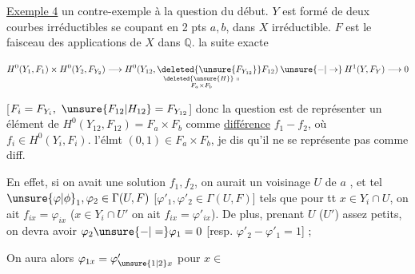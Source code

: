 
\uline{Exemple 4}  un contre-exemple à la question du début. $Y$ est formé de deux courbes irréductibles  se coupant en 2 pts $a,b$, dans $X$ irréductible. $F$ est le faisceau des applications de $X$ dans $\mathbb{Q}$.   la suite exacte


\[
H^0(Y_1,F_1)\times H^0(Y_2,F_{Y_2})\longrightarrow
\underset{\substack{\deleted{\unsure{H}}\ \shortparallel\\F_a\times F_b}}{H^0(Y_{12},\deleted{\unsure{F_{Y_{12}}}} F_{12})}
\mathbin{\unsure{-|\to}}H^1(Y,F_Y)\longrightarrow0
\]

[$F_i=F_{Y_i},\ \unsure{F_{12}|H_{12}}=F_{Y_{12}}$] donc la question est de représenter un élément de $H^0(Y_{12},F_{12})=F_a\times F_b$ comme \uline{différence} $f_1-f_2$, où $f_i\in H^0(Y_i,F_i)$.  l'élmt $(0,1)\in F_a\times F_b$, je dis qu'il ne se représente pas comme diff.

En effet, si on avait une solution $f_1,f_2$, on aurait un voisinage $U$  de $a$ , et  tel  $\unsure{\varphi|\phi}_1,\varphi_2\in\Gamma(U,F)$  [$\varphi'_1,\varphi'_2\in\Gamma(U,F)$]  tels que pour tt $x\in Y_i\cap U$, on ait $f_{ix}=\varphi_{ix}$ ($x\in Y_i\cap U'$ on ait $f_{ix}=\varphi'_{ix}$). De plus, prenant $U$ ($U'$) assez petits, on devra avoir  $\varphi_2\unsure{-|=}\varphi_1=0$ [resp. $\varphi'_2-\varphi'_1=1$] ;

 On aura alors $\varphi_{1x}=\varphi'_{\unsure{1|2}x}$  pour $x\in$
